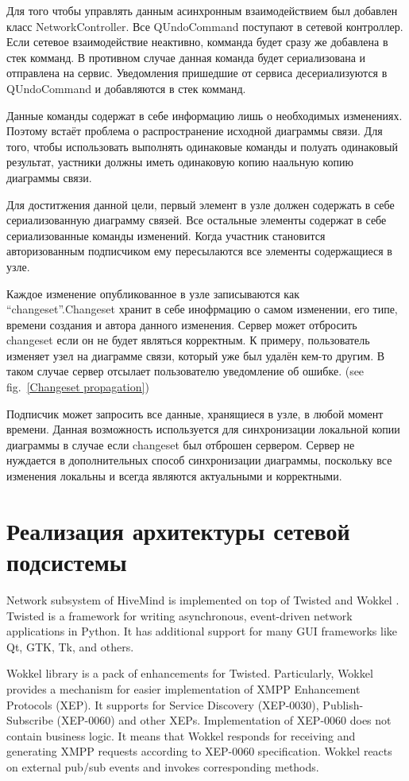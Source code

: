 Для того чтобы управлять данным асинхронным взаимодействием был добавлен класс NetworkController. Все QUndoCommand поступают в сетевой контроллер. Если сетевое взаимодействие неактивно, комманда будет сразу же добавлена в стек комманд. В противном случае данная команда будет сериализована и отправлена на сервис. Уведомления пришедшие от сервиса десериализуются в QUndoCommand и добавляются в стек комманд.

Данные команды содержат в себе информацию лишь о необходимых изменениях. Поэтому встаёт проблема о распространение исходной диаграммы связи. Для того, чтобы использовать выполнять одинаковые команды и полуать одинаковый результат, уастники должны иметь одинаковую копию наальную копию диаграммы связи.

Для доститжения данной цели, первый элемент в узле должен содержать в себе сериализованную диаграмму связей. Все остальные элементы содержат в себе сериализованные команды изменений. Когда участник становится авторизованным подписчиком ему пересылаются все элементы содержащиеся в узле.

Каждое изменение опубликованное в узле записываются как ``changeset''.Changeset хранит в себе инофрмацию о самом изменении, его типе, времени создания и автора данного изменения. Сервер может отбросить changeset если он не будет являться корректным. К примеру, пользователь изменяет узел на диаграмме связи, который уже был удалён кем-то другим. В таком случае сервер отсылает пользователю уведомление об ошибке. (see fig.~\ref{Changeset propagation})

Подписчик может запросить все данные, хранящиеся в узле, в любой момент времени. Данная возможность используется для синхронизации локальной копии диаграммы в случае если changeset был отброшен сервером. Сервер не нуждается в дополнительных способ синхронизации диаграммы, поскольку все изменения локальны и всегда являются актуальными и корректными.

\section{Реализация архитектуры сетевой подсистемы}

Network subsystem of HiveMind is implemented on top of Twisted \cite{twisted} and
Wokkel \cite{wokkel}. Twisted is a framework for writing asynchronous,
event-driven network applications in Python. It has additional support for many
GUI frameworks like Qt, GTK, Tk, and others.

Wokkel library is a pack of enhancements for Twisted. Particularly, Wokkel
provides a mechanism for easier implementation of XMPP Enhancement Protocols
(XEP). It supports for Service Discovery (XEP-0030), Publish-Subscribe
(XEP-0060) and other XEPs. Implementation of XEP-0060 does not contain business
logic. It means that Wokkel responds for receiving and generating XMPP requests
according to XEP-0060 specification. Wokkel reacts on external pub/sub events
and invokes corresponding methods.


